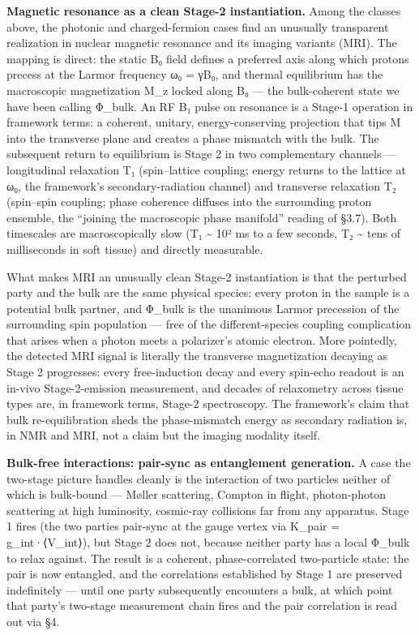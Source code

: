 \documentclass[
]{article}
\begin{document}
\textbf{Magnetic resonance as a clean Stage-2 instantiation.} Among the
classes above, the photonic and charged-fermion cases find an unusually
transparent realization in nuclear magnetic resonance and its imaging
variants (MRI). The mapping is direct: the static B₀ field defines a
preferred axis along which protons precess at the Larmor frequency ω₀ =
γB₀, and thermal equilibrium has the macroscopic magnetization M\_z
locked along B₀ --- the bulk-coherent state we have been calling
Φ\_bulk. An RF B₁ pulse on resonance is a Stage-1 operation in framework
terms: a coherent, unitary, energy-conserving projection that tips M
into the transverse plane and creates a phase mismatch with the bulk.
The subsequent return to equilibrium is Stage 2 in two complementary
channels --- longitudinal relaxation T₁ (spin--lattice coupling; energy
returns to the lattice at ω₀, the framework's secondary-radiation
channel) and transverse relaxation T₂ (spin--spin coupling; phase
coherence diffuses into the surrounding proton ensemble, the ``joining
the macroscopic phase manifold'' reading of §3.7). Both timescales are
macroscopically slow (T₁ \textasciitilde{} 10² ms to a few seconds, T₂
\textasciitilde{} tens of milliseconds in soft tissue) and directly
measurable.

What makes MRI an unusually clean Stage-2 instantiation is that the
perturbed party and the bulk are the same physical species: every proton
in the sample is a potential bulk partner, and Φ\_bulk is the unanimous
Larmor precession of the surrounding spin population --- free of the
different-species coupling complication that arises when a photon meets
a polarizer's atomic electron. More pointedly, the detected MRI signal
is literally the transverse magnetization decaying as Stage 2
progresses: every free-induction decay and every spin-echo readout is an
in-vivo Stage-2-emission measurement, and decades of relaxometry across
tissue types are, in framework terms, Stage-2 spectroscopy. The
framework's claim that bulk re-equilibration sheds the phase-mismatch
energy as secondary radiation is, in NMR and MRI, not a claim but the
imaging modality itself.

\textbf{Bulk-free interactions: pair-sync as entanglement generation.} A
case the two-stage picture handles cleanly is the interaction of two
particles neither of which is bulk-bound --- Møller scattering, Compton
in flight, photon-photon scattering at high luminosity, cosmic-ray
collisions far from any apparatus. Stage 1 fires (the two parties
pair-sync at the gauge vertex via K\_pair = g\_int·⟨V\_int⟩), but Stage
2 does not, because neither party has a local Φ\_bulk to relax against.
The result is a coherent, phase-correlated two-particle state: the pair
is now entangled, and the correlations established by Stage 1 are
preserved indefinitely --- until one party subsequently encounters a
bulk, at which point that party's two-stage measurement chain fires and
the pair correlation is read out via §4.
\end{document}

